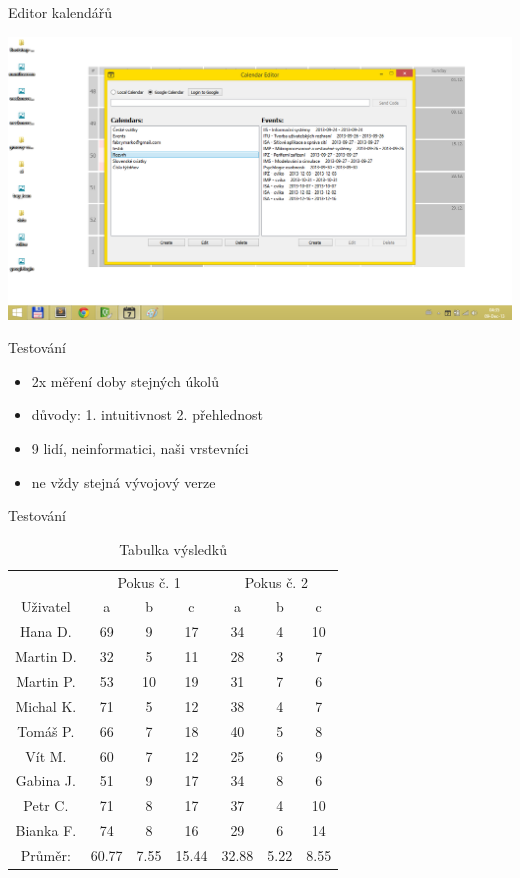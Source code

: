 \documentclass[17pt]{beamer}
\begin{document}
\begin{frame}{Editor kalendářů}
    \begin{center}
    \includegraphics[width=\textwidth,height=\textheight,keepaspectratio]{editorgoogle.png}
    \end{center}
\end{frame}

\begin{frame}{Testování}
\begin{itemize}
    \item 2x měření doby stejných úkolů
    \item důvody: 1. intuitivnost 2. přehlednost
    \item 9 lidí, neinformatici, naši vrstevníci
    \item ne vždy stejná vývojový verze
\end{itemize}
\end{frame}

\begin{frame}{Testování}
\begin{table}[h]
{\tiny
    \begin{center}
    \begin{tabular}{| c | c | c | c || c | c | c |}
    \hline
     & \multicolumn{3}{|c||}{Pokus č. 1} & \multicolumn{3}{c|}{Pokus č. 2}\\
    Uživatel & a & b & c & a & b & c \\
    \hline
    Hana D. & 69 & 9 & 17 & 34 & 4 & 10 \\
    Martin D. & 32 & 5 & 11 & 28 & 3 & 7 \\
    Martin P. & 53 & 10& 19 & 31 & 7 & 6 \\
    Michal K. & 71 & 5 & 12 & 38 & 4 & 7 \\
    Tomáš P. & 66 & 7 & 18 & 40 & 5 & 8 \\
    Vít M. & 60 & 7 & 12 & 25 & 6 & 9 \\
    Gabina J. & 51 & 9 & 17 & 34 & 8 & 6 \\
    Petr C. & 71 & 8 & 17 & 37 & 4 & 10 \\
    Bianka F. & 74 & 8 & 16 & 29 & 6 & 14 \\
    \hline
    Průměr: & 60.77 & 7.55 & 15.44 & 32.88 & 5.22 & 8.55\\
    \hline
    \end{tabular}
    \caption{Tabulka výsledků}
    \label{tab:vysledky}
    \end{center}
   }
\end{table}
\end{frame}
\end{document}
